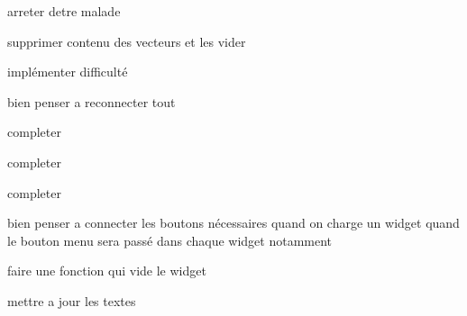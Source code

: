 \begin{DoxyRefList}
arreter d\textquotesingle{}etre malade  
\item[\label{todo__todo000011}%
\Hypertarget{todo__todo000011}%
Member \hyperlink{class_mod_memory_a77d39288e861c84edcfa760170fbc44d}{Mod\+Memory\+:\+:$\sim$\+Mod\+Memory} ()]supprimer contenu des vecteurs et les vider  
\item[\label{todo__todo000017}%
\Hypertarget{todo__todo000017}%
Member \hyperlink{class_mod_simon_a01de269fc7beadbe1199c233ba24ada4}{Mod\+Simon\+:\+:ini\+Score\+To\+Reach} (void)]implémenter difficulté  
\item[\label{todo__todo000021}%
\Hypertarget{todo__todo000021}%
Member \hyperlink{class_robin_main_window_a0850e17ae24394b14eb2dcfc4f15eeca}{Robin\+Main\+Window\+:\+:back\+To\+Menu} (void)]bien penser a reconnecter tout  
\item[\label{todo__todo000022}%
\Hypertarget{todo__todo000022}%
Member \hyperlink{class_robin_main_window_a55e49d0a4d727066b553fc2277dd8a78}{Robin\+Main\+Window\+:\+:open\+Calcul} (void)]completer  
\item[\label{todo__todo000024}%
\Hypertarget{todo__todo000024}%
Member \hyperlink{class_robin_main_window_aaf62641d678eb0f8829a2fb9c513ae68}{Robin\+Main\+Window\+:\+:open\+Memory} (void)]completer  
\item[\label{todo__todo000023}%
\Hypertarget{todo__todo000023}%
Member \hyperlink{class_robin_main_window_ab00b403de3169493a08c53f5d623ce6b}{Robin\+Main\+Window\+:\+:open\+Simon} (void)]completer  
\item[\label{todo__todo000019}%
\Hypertarget{todo__todo000019}%
Member \hyperlink{class_robin_main_window_a55f7775f5daefb2099a51e97d50df666}{Robin\+Main\+Window\+:\+:Robin\+Main\+Window} (Q\+Widget $\ast$parent=0)]bien penser a connecter les boutons nécessaires quand on charge un widget quand le bouton menu sera passé dans chaque widget notamment  
\item[\label{todo__todo000020}%
\Hypertarget{todo__todo000020}%
Member \hyperlink{class_robin_main_window_a72eb8450efc1dfe22e2f36c7f728c5f3}{Robin\+Main\+Window\+:\+:$\sim$\+Robin\+Main\+Window} ()]faire une fonction qui vide le widget  
\item[\label{todo__todo000025}%
\Hypertarget{todo__todo000025}%
Member \hyperlink{class_super_simon_a8d5c23562cd6b048720003d3c796ac7a}{Super\+Simon\+:\+:update\+View\+Simon} (void)]mettre a jour les textes 
\end{DoxyRefList}